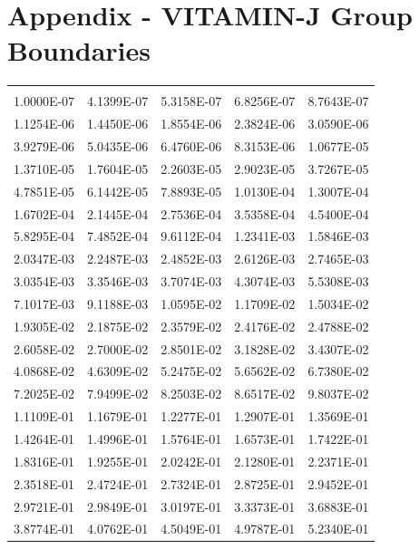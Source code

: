 \documentclass[12pt]{article}
\begin{document}
\section{Appendix - VITAMIN-J Group Boundaries}
\label{appendix_b}
\begin{centering}
 \begin{table}[ht!]
  \begin{tabular}{| c  c  c  c  c |}
  \hline
  \\
  1.0000E-07 & 4.1399E-07 & 5.3158E-07 & 6.8256E-07 & 8.7643E-07\\
  1.1254E-06 & 1.4450E-06 & 1.8554E-06 & 2.3824E-06 & 3.0590E-06\\
  3.9279E-06 & 5.0435E-06 & 6.4760E-06 & 8.3153E-06 & 1.0677E-05\\
  1.3710E-05 & 1.7604E-05 & 2.2603E-05 & 2.9023E-05 & 3.7267E-05\\
  4.7851E-05 & 6.1442E-05 & 7.8893E-05 & 1.0130E-04 & 1.3007E-04\\
  1.6702E-04 & 2.1445E-04 & 2.7536E-04 & 3.5358E-04 & 4.5400E-04\\
  5.8295E-04 & 7.4852E-04 & 9.6112E-04 & 1.2341E-03 & 1.5846E-03\\
  2.0347E-03 & 2.2487E-03 & 2.4852E-03 & 2.6126E-03 & 2.7465E-03\\
  3.0354E-03 & 3.3546E-03 & 3.7074E-03 & 4.3074E-03 & 5.5308E-03\\
  7.1017E-03 & 9.1188E-03 & 1.0595E-02 & 1.1709E-02 & 1.5034E-02\\
  1.9305E-02 & 2.1875E-02 & 2.3579E-02 & 2.4176E-02 & 2.4788E-02\\
  2.6058E-02 & 2.7000E-02 & 2.8501E-02 & 3.1828E-02 & 3.4307E-02\\
  4.0868E-02 & 4.6309E-02 & 5.2475E-02 & 5.6562E-02 & 6.7380E-02\\
  7.2025E-02 & 7.9499E-02 & 8.2503E-02 & 8.6517E-02 & 9.8037E-02\\
  1.1109E-01 & 1.1679E-01 & 1.2277E-01 & 1.2907E-01 & 1.3569E-01\\
  1.4264E-01 & 1.4996E-01 & 1.5764E-01 & 1.6573E-01 & 1.7422E-01\\
  1.8316E-01 & 1.9255E-01 & 2.0242E-01 & 2.1280E-01 & 2.2371E-01\\
  2.3518E-01 & 2.4724E-01 & 2.7324E-01 & 2.8725E-01 & 2.9452E-01\\
  2.9721E-01 & 2.9849E-01 & 3.0197E-01 & 3.3373E-01 & 3.6883E-01\\
  3.8774E-01 & 4.0762E-01 & 4.5049E-01 & 4.9787E-01 & 5.2340E-01\\

\end{tabular}
\end{table}
\end{centering}
\end{document}
